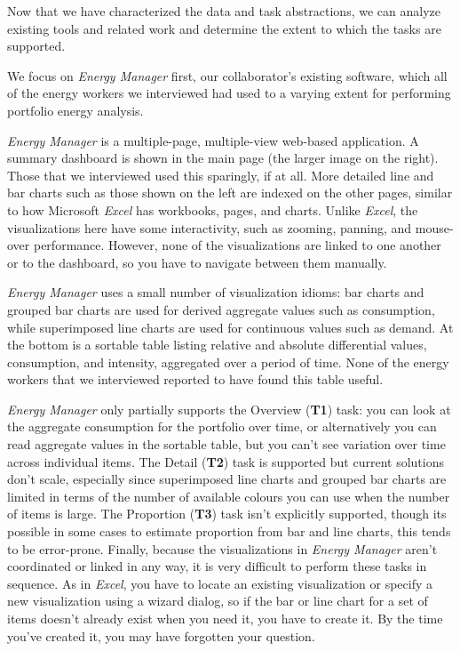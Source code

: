\documentclass[journal]{vgtc}                %
\newcommand{\bstart}[1]{\vspace{1mm} \noindent{\textbf{#1:}}}
\begin{document}

Now that we have characterized the data and task abstractions, we can analyze existing tools and related work and determine the extent to which the tasks are supported.


We focus on {\it Energy Manager} first, our collaborator's existing software, which all of the energy workers we interviewed had used to a varying extent for performing portfolio energy analysis.

{\it Energy Manager} is a multiple-page, multiple-view web-based application.
A summary dashboard is shown in the main page (the larger image on the right). 
Those that we interviewed used this sparingly, if at all. 
More detailed line and bar charts such as those shown on the left are indexed on the other pages, similar to how Microsoft {\it Excel} has workbooks, pages, and charts. 
Unlike {\it Excel}, the visualizations here have some interactivity, such as zooming, panning, and mouse-over performance. 
However, none of the visualizations are linked to one another or to the dashboard, so you have to navigate between them manually.

\bstart{Analysis} {\it Energy Manager} uses a small number of visualization idioms: bar charts and grouped bar charts are used for derived aggregate values such as consumption, while superimposed line charts are used for continuous values such as demand. 
At the bottom is a sortable table listing relative and absolute differential values, consumption, and intensity, aggregated over a period of time. 
None of the energy workers that we interviewed reported to have found this table useful.

{\it Energy Manager} only partially supports the Overview ({\bf T1}) task: you can look at the aggregate consumption for the portfolio over time, or alternatively you can read aggregate values in the sortable table, but you can't see variation over time across individual items. 
The Detail ({\bf T2}) task is supported but current solutions don't scale, especially since superimposed line charts and grouped bar charts are limited in terms of the number of available colours you can use when the number of items is large. 
The Proportion ({\bf T3}) task isn't explicitly supported, though its possible in some cases to estimate proportion from bar and line charts, this tends to be error-prone.
Finally, because the visualizations in {\it Energy Manager} aren't coordinated or linked in any way, it is very difficult to perform these tasks in sequence. 
As in {\it Excel}, you have to locate an existing visualization or specify a new visualization using a wizard dialog, so if the bar or line chart for a set of items doesn't already exist when you need it, you have to create it. By the time you've created it, you may have forgotten your question.
\end{document}
